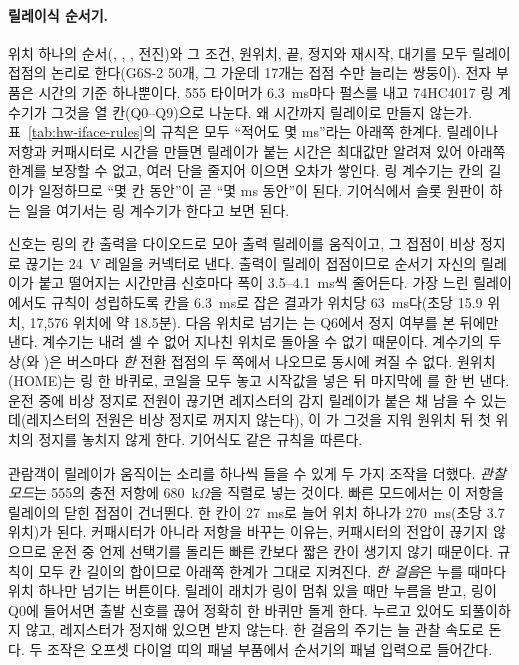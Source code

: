 \paragraph{릴레이식 순서기.} 위치 하나의 순서(, , , 전진)와 그 조건, 원위치, 끝,
정지와 재시작, 대기를 모두 릴레이 접점의 논리로 한다(G6S-2 50개, 그 가운데 17개는 접점 수만 늘리는 쌍둥이). 전자 부품은
시간의 기준 하나뿐이다. 555 타이머가 6.3~ms마다 펄스를 내고 74HC4017 링 계수기가 그것을 열 칸(Q0--Q9)으로 나눈다.
왜 시간까지 릴레이로 만들지 않는가. 표~\ref{tab:hw-iface-rules}의 규칙은 모두 ``적어도 몇 ms''라는 아래쪽 한계다. 릴레이나
저항과 커패시터로 시간을 만들면 릴레이가 붙는 시간은 최대값만 알려져 있어 아래쪽 한계를 보장할 수 없고, 여러 단을 줄지어
이으면 오차가 쌓인다. 링 계수기는 칸의 길이가 일정하므로 ``몇 칸 동안''이 곧 ``몇 ms 동안''이 된다. 기어식에서 슬롯 원판이
하는 일을 여기서는 링 계수기가 한다고 보면 된다.

신호는 링의 칸 출력을 다이오드로 모아 출력 릴레이를 움직이고, 그 접점이 비상 정지로 끊기는 24~V 레일을 커넥터로 낸다.
출력이 릴레이 접점이므로 순서기 자신의 릴레이가 붙고 떨어지는 시간만큼 신호마다 폭이 3.5--4.1~ms씩 줄어든다. 가장 느린
릴레이에서도 규칙이 성립하도록 칸을 6.3~ms로 잡은 결과가 위치당 63~ms다(초당 15.9 위치, 17,576 위치에 약 18.5분). 다음
위치로 넘기는 는 Q6에서 정지 여부를 본 뒤에만 낸다. 계수기는 내려 셀 수 없어 지나친 위치로 돌아올 수 없기
때문이다. 계수기의 두 상(와 )은 버스마다 \emph{한} 전환 접점의 두 쪽에서 나오므로 동시에 켜질 수 없다.
원위치(HOME)는 링 한 바퀴로, 코일을 모두 놓고 시작값을 넣은 뒤 마지막에 를 한 번 낸다. 운전 중에 비상 정지로
전원이 끊기면 레지스터의 감지 릴레이가 붙은 채 남을 수 있는데(레지스터의 전원은 비상 정지로 꺼지지 않는다), 이 가
그것을 지워 원위치 뒤 첫 위치의 정지를 놓치지 않게 한다. 기어식도 같은 규칙을 따른다.

관람객이 릴레이가 움직이는 소리를 하나씩 들을 수 있게 두 가지 조작을 더했다. \emph{관찰 모드}는 555의 충전 저항에
680~k$\Omega$을 직렬로 넣는 것이다. 빠른 모드에서는 이 저항을 릴레이의 닫힌 접점이 건너뛴다. 한 칸이 27~ms로 늘어 위치
하나가 270~ms(초당 3.7 위치)가 된다. 커패시터가 아니라 저항을 바꾸는 이유는, 커패시터의 전압이 끊기지 않으므로 운전 중
언제 선택기를 돌리든 빠른 칸보다 짧은 칸이 생기지 않기 때문이다. 규칙이 모두 칸 길이의 합이므로 아래쪽 한계가 그대로
지켜진다. \emph{한 걸음}은 누를 때마다 위치 하나만 넘기는 버튼이다. 릴레이 래치가 링이 멈춰 있을 때만 누름을 받고, 링이
Q0에 들어서면 출발 신호를 끊어 정확히 한 바퀴만 돌게 한다. 누르고 있어도 되풀이하지 않고, 레지스터가 정지해 있으면
받지 않는다. 한 걸음의 주기는 늘 관찰 속도로 돈다. 두 조작은 오프셋 다이얼 띠의 패널 부품에서 순서기의 패널 입력으로
들어간다.

